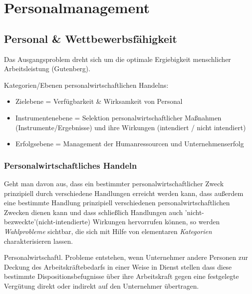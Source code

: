 \documentclass[11pt]{article}
\begin{document}
\section{Personalmanagement}
\label{sec:orgbe6ce8a}
\subsection{Personal \& Wettbewerbsfähigkeit}
\label{sec:orge4ef43a}
Das Ausgangsproblem dreht sich um die optimale Ergiebigkeit menschlicher Arbeitsleistung (Gutenberg).

Kategorien/Ebenen personalwirtschaftlichen Handelns:
\begin{itemize}
\item Zielebene = Verfügbarkeit \& Wirksamkeit von Personal
\item Instrumentenebene = Selektion personalwirtschaftlicher Maßnahmen (Instrumente/Ergebnisse) und ihre Wirkungen (intendiert / nicht intendiert)
\item Erfolgsebene = Management der Humanressourcen und Unternehmenserfolg
\end{itemize}

\subsubsection{Personalwirtschaftliches Handeln}
\label{sec:org2172a29}
Geht man davon aus, dass ein bestimmter personalwirtschaftlicher Zweck prinzipiell durch verschiedene Handlungen erreicht werden kann, dass außerdem eine bestimmte Handlung prinzipiell verschiedenen personalwirtschaftlichen Zwecken dienen kann und dass schließlich Handlungen auch 'nicht-bezweckte'(nicht-intendierte) Wirkungen hervorrufen können, so werden \emph{Wahlprobleme} sichtbar, die sich mit Hilfe von elementaren \emph{Kategorien} charakterisieren lassen.

Personalwirtschaftl. Probleme entstehen, wenn Unternehmer andere Personen zur Deckung des Arbeitskräftebedarfs in einer Weise in Dienst stellen dass diese bestimmte Dispositionsbefugnisse über ihre Arbeitskraft gegen eine festgelegte Vergütung direkt oder indirekt auf den Unternehmer übertragen.
\end{document}
